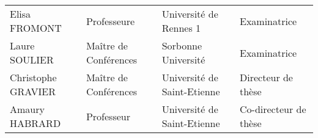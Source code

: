 \begin{titlepage}
\begin{center}
\begin{table}[h]
{\begin{tabular}{@{}llll@{}}
      Elisa FROMONT      & Professeure           &
      Université de Rennes 1                     & Examinatrice\\

      Laure SOULIER      & Maître de Conférences &
      Sorbonne Université                        & Examinatrice\\

      Christophe GRAVIER & Maître de Conférences &
      Université de Saint-Etienne                & Directeur de thèse\\

      Amaury HABRARD     & Professeur            &
      Université de Saint-Etienne                & Co-directeur de thèse\\
      \bottomrule[0.12em]
    \end{tabular}}
  \end{table}

\end{center}
\end{titlepage}
